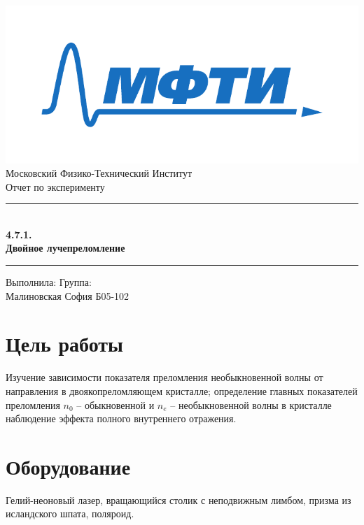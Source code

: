 \documentclass[a4paper,12pt]{article}
\begin{document}
\begin{titlepage}
		\vspace*{\fill}
		
		\begin{center}
			\includegraphics[scale=0.8]{MIPT.pdf}
			\\[0.7cm]\Huge Московский Физико-Технический Институт
			\\[2cm]\LARGE Отчет по эксперименту
			\\[0.5cm]\noindent\rule{\textwidth}{1pt}
			\\\Huge\textbf{4.7.1. \\ Двойное лучепреломление}
			\\[-0.5cm]\noindent\rule{\textwidth}{1pt}
		\end{center}
		
		\vspace*{\fill}
		
		\begin{flushleft}
			Выполнила: \hspace{\fill} Группа:
			\\Малиновская София \hspace{\fill} Б05-102
		\end{flushleft}
	\end{titlepage}

	\setcounter{page}{2}


\section*{Цель работы}
 Изучение зависимости показателя преломления необыкновенной волны от направления в двоякопреломляющем кристалле; определение главных показателей преломления $n_0$ -- обыкновенной и $n_e$ -- необыкновенной волны в кристалле наблюдение эффекта полного внутреннего отражения.
 
\section*{Оборудование}
Гелий-неоновый лазер, вращающийся столик с неподвижным лимбом, призма из исландского шпата, поляроид.
\end{document}
